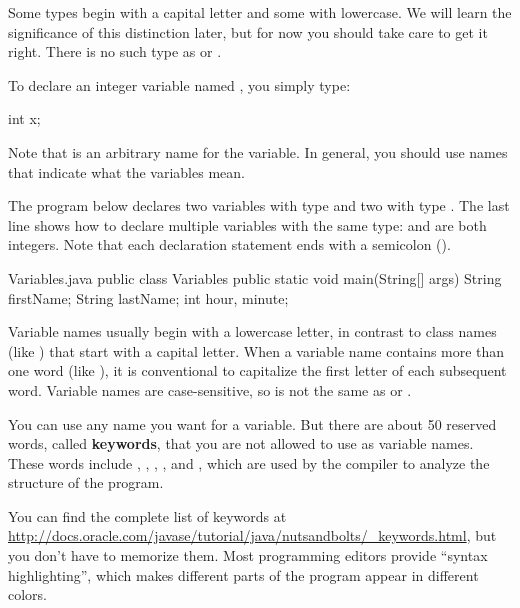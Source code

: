 Some types begin with a capital letter and some with lowercase.
We will learn the significance of this distinction later, but for now you should take care to get it right.
There is no such type as  or .

To declare an integer variable named , you simply type:

\begin{code}
int x;
\end{code}

Note that  is an arbitrary name for the variable.
In general, you should use names that indicate what the variables mean.


The program below declares two variables with type  and two with type .
The last line shows how to declare multiple variables with the same type:  and  are both integers.
Note that each declaration statement ends with a semicolon (\java{;}).

\begin{trinket}[225]{Variables.java}
public class Variables {
  public static void main(String[] args) {
    String firstName;
    String lastName;
    int hour, minute;
  }
}
\end{trinket}


Variable names usually begin with a lowercase letter, in contrast to class names (like ) that start with a capital letter.
When a variable name contains more than one word (like ), it is conventional to capitalize the first letter of each subsequent word.
Variable names are case-sensitive, so  is not the same as  or .


You can use any name you want for a variable.
But there are about 50 reserved words, called {\bf keywords}, that you are not allowed to use as variable names.
These words include , , , , and , which are used by the compiler to analyze the structure of the program.

You can find the complete list of keywords at \url{http://docs.oracle.com/javase/tutorial/java/nutsandbolts/_keywords.html}, but you don't have to memorize them.
Most programming editors provide ``syntax highlighting'', which makes different parts of the program appear in different colors.


